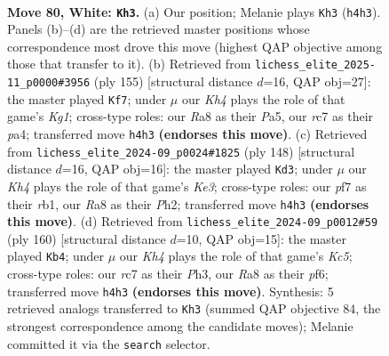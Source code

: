 \documentclass[11pt]{article}
\begin{document}
\clearpage

\begin{figure}[p]\centering
\begin{subfigure}{0.46\textwidth}\centering
\resizebox{\linewidth}{!}{%
\newchessgame
\chessboard[
  setfen={R7/2r2p2/1R2p2k/8/P3P2K/5P2/8/8 w - - 51 80},
  showmover=false,
  pgfstyle=straightmove, color=movearrow, markmove={h4-h3}
]}
\caption{}
\end{subfigure}\hfill
\begin{subfigure}{0.46\textwidth}\centering
\resizebox{\linewidth}{!}{%
\newchessgame
\chessboard[
  setfen={1r4k1/6p1/1P6/p7/P7/1R6/5K2/8 b - - 0 78},
  showmover=false,
  pgfstyle=straightmove, color=movearrow, markmove={g8-f7}
]}
\caption{}
\end{subfigure}
\\[4pt]
\begin{subfigure}{0.46\textwidth}\centering
\resizebox{\linewidth}{!}{%
\newchessgame
\chessboard[
  setfen={8/1R6/pp3k2/6p1/2P5/4K2P/7P/1r6 w - - 17 75},
  showmover=false,
  pgfstyle=straightmove, color=movearrow, markmove={e3-d3}
]}
\caption{}
\end{subfigure}\hfill
\begin{subfigure}{0.46\textwidth}\centering
\resizebox{\linewidth}{!}{%
\newchessgame
\chessboard[
  setfen={r7/2k5/5p2/2K2Pp1/p5P1/R6P/8/8 w - - 2 81},
  showmover=false,
  pgfstyle=straightmove, color=movearrow, markmove={c5-b4}
]}
\caption{}
\end{subfigure}
\caption{\textbf{Move 80, White: \texttt{Kh3}.} (a) Our position; Melanie plays \texttt{Kh3} (\texttt{h4h3}). Panels (b)--(d) are the retrieved master positions whose correspondence most drove this move (highest QAP objective among those that transfer to it). (b) Retrieved from \texttt{lichess\_elite\_2025-11\_p0000\#3956} (ply 155) [structural distance $d$=16, QAP obj=27]: the master played \texttt{Kf7}; under $\mu$ our \emph{Kh4} plays the role of that game's \emph{Kg1}; cross-type roles: our \emph{R}a8 as their \emph{P}a5, our \emph{r}c7 as their \emph{p}a4; transferred move \texttt{h4h3} \textbf{(endorses this move)}. (c) Retrieved from \texttt{lichess\_elite\_2024-09\_p0024\#1825} (ply 148) [structural distance $d$=16, QAP obj=16]: the master played \texttt{Kd3}; under $\mu$ our \emph{Kh4} plays the role of that game's \emph{Ke3}; cross-type roles: our \emph{p}f7 as their \emph{r}b1, our \emph{R}a8 as their \emph{P}h2; transferred move \texttt{h4h3} \textbf{(endorses this move)}. (d) Retrieved from \texttt{lichess\_elite\_2024-09\_p0012\#59} (ply 160) [structural distance $d$=10, QAP obj=15]: the master played \texttt{Kb4}; under $\mu$ our \emph{Kh4} plays the role of that game's \emph{Kc5}; cross-type roles: our \emph{r}c7 as their \emph{P}h3, our \emph{R}a8 as their \emph{p}f6; transferred move \texttt{h4h3} \textbf{(endorses this move)}. Synthesis: 5 retrieved analogs transferred to \texttt{Kh3} (summed QAP objective 84, the strongest correspondence among the candidate moves); Melanie committed it via the \texttt{search} selector.}
\label{fig:thought-m158}
\end{figure}
\end{document}
